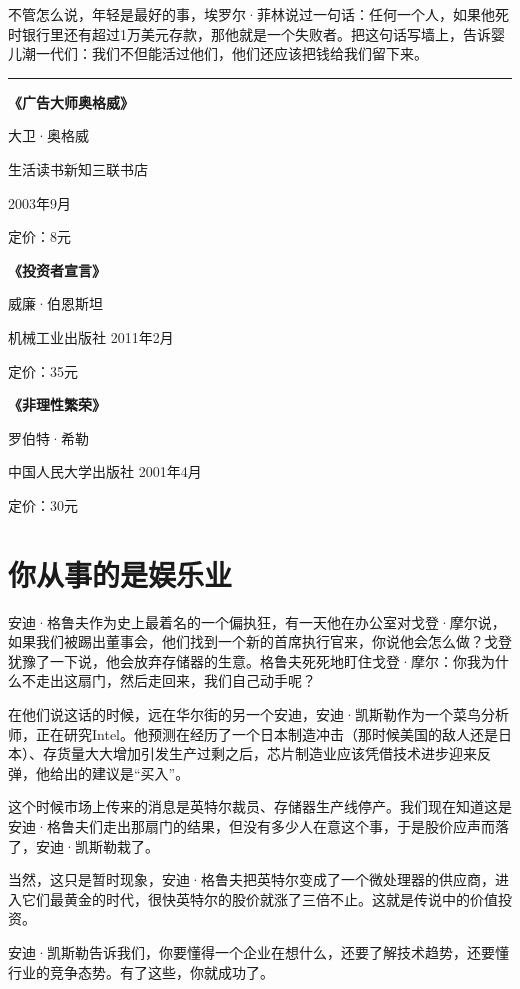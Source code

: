 不管怎么说，年轻是最好的事，埃罗尔·菲林说过一句话：任何一个人，如果他死时银行里还有超过1万美元存款，那他就是一个失败者。把这句话写墙上，告诉婴儿潮一代们：我们不但能活过他们，他们还应该把钱给我们留下来。

\begin{center}\rule{0.5\linewidth}{0.5pt}\end{center}

\textbf{《广告大师奥格威》}

大卫·奥格威

生活读书新知三联书店

2003年9月

定价：8元

\textbf{《投资者宣言》}

威廉·伯恩斯坦

机械工业出版社 2011年2月

定价：35元

\textbf{《非理性繁荣》}

罗伯特·希勒

中国人民大学出版社 2001年4月

定价：30元

\hypertarget{ux4f60ux4eceux4e8bux7684ux662fux5a31ux4e50ux4e1a}{%
\section{你从事的是娱乐业}\label{ux4f60ux4eceux4e8bux7684ux662fux5a31ux4e50ux4e1a}}

安迪·格鲁夫作为史上最着名的一个偏执狂，有一天他在办公室对戈登·摩尔说，如果我们被踢出董事会，他们找到一个新的首席执行官来，你说他会怎么做？戈登犹豫了一下说，他会放弃存储器的生意。格鲁夫死死地盯住戈登·摩尔：你我为什么不走出这扇门，然后走回来，我们自己动手呢？

在他们说这话的时候，远在华尔街的另一个安迪，安迪·凯斯勒作为一个菜鸟分析师，正在研究Intel。他预测在经历了一个日本制造冲击（那时候美国的敌人还是日本）、存货量大大增加引发生产过剩之后，芯片制造业应该凭借技术进步迎来反弹，他给出的建议是``买入''。

这个时候市场上传来的消息是英特尔裁员、存储器生产线停产。我们现在知道这是安迪·格鲁夫们走出那扇门的结果，但没有多少人在意这个事，于是股价应声而落了，安迪·凯斯勒栽了。

当然，这只是暂时现象，安迪·格鲁夫把英特尔变成了一个微处理器的供应商，进入它们最黄金的时代，很快英特尔的股价就涨了三倍不止。这就是传说中的价值投资。

安迪·凯斯勒告诉我们，你要懂得一个企业在想什么，还要了解技术趋势，还要懂行业的竞争态势。有了这些，你就成功了。

